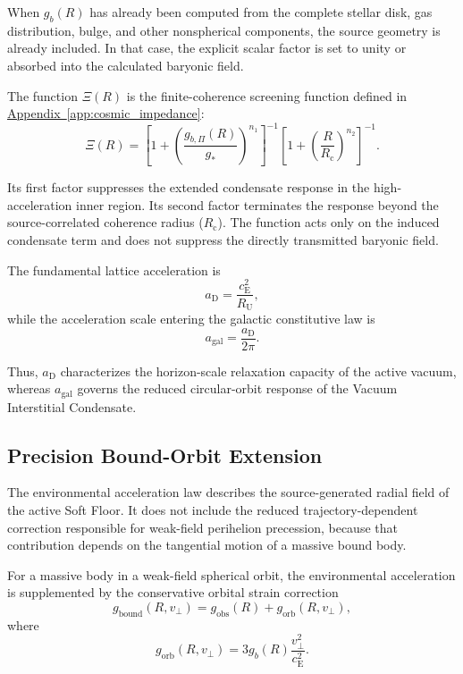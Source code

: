 When $g_b(R)$ has already been computed from the complete stellar disk, gas distribution, bulge, and other nonspherical components, the source geometry is already included. In that case, the explicit scalar factor is set to unity or absorbed into the calculated baryonic field.

The function $\Xi(R)$ is the finite-coherence screening function defined in \hyperref[app:cosmic_impedance]{Appendix~\ref*{app:cosmic_impedance}}:
\begin{equation}
    \Xi(R) = \left[ 1+ \left( \frac{g_{b,\Pi}(R)}{g_*} \right)^{n_1} \right]^{-1} \left[ 1+ \left( \frac{R}{R_{\mathrm{c}}} \right)^{n_2} \right]^{-1}.
\end{equation}

Its first factor suppresses the extended condensate response in the high-acceleration inner region. Its second factor terminates the response beyond the source-correlated coherence radius ($R_{\mathrm{c}}$). The function acts only on the induced condensate term and does not suppress the directly transmitted baryonic field.

The fundamental lattice acceleration is
\begin{equation}
    a_{\mathrm{D}} = \frac{c_{\mathrm{E}}^2}{R_{\mathrm{U}}},
\end{equation}
while the acceleration scale entering the galactic constitutive law is
\begin{equation}
    a_{\mathrm{gal}} = \frac{a_{\mathrm{D}}}{2\pi}.
\end{equation}

Thus, $a_{\mathrm{D}}$ characterizes the horizon-scale relaxation capacity of the active vacuum, whereas $a_{\mathrm{gal}}$ governs the reduced circular-orbit response of the Vacuum Interstitial Condensate.

\subsection{Precision Bound-Orbit Extension}

The environmental acceleration law describes the source-generated radial field of the active Soft Floor. It does not include the reduced trajectory-dependent correction responsible for weak-field perihelion precession, because that contribution depends on the tangential motion of a massive bound body.

For a massive body in a weak-field spherical orbit, the environmental acceleration is supplemented by the conservative orbital strain correction
\begin{equation}
    g_{\mathrm{bound}}(R,v_\perp) = g_{\mathrm{obs}}(R) + g_{\mathrm{orb}}(R,v_\perp),
\end{equation}
where
\begin{equation}
    g_{\mathrm{orb}}(R,v_\perp) = 3g_b(R) \frac{v_\perp^2}{c_{\mathrm{E}}^2}.
\end{equation}

